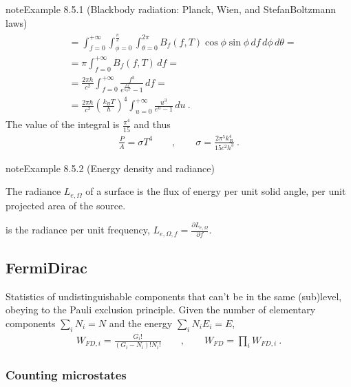 \documentclass[letterpaper,10pt,english]{jupyterBook}
\begin{document}
\begin{sphinxadmonition}{note}{Example 8.5.1 (Black\sphinxhyphen{}body radiation: Planck, Wien, and Stefan\sphinxhyphen{}Boltzmann laws)}
\begin{equation*}
\begin{split}
\begin{aligned}
  & = \int_{f=0}^{+\infty} \int_{\phi = 0}^{\frac{\pi}{2}} \int_{\theta=0}^{2\pi} B_{f}(f,T) \cos \phi \sin \phi \, df \, d\phi \, d \theta = \\
  & = \pi \int_{f=0}^{+\infty} B_{f}(f,T) \, d f = \\
  & = \frac{2 \pi h}{c^2} \int_{f=0}^{+\infty} \frac{f^3}{e^{\frac{hf}{k_B T}} - 1} \, d f = \\
  & = \frac{2 \pi h}{c^2} \left( \frac{k_B T}{h} \right)^4 \int_{u=0}^{+\infty} \frac{u^3}{e^u - 1} \, d u \ .
\end{aligned}\end{split}
\end{equation*}
\sphinxAtStartPar
The value of the integral is \(\frac{\pi^4}{15}\) and thus
\begin{equation*}
\begin{split}\frac{P}{A} = \sigma T^4 \qquad , \qquad \sigma = \frac{2 \pi^5 k_B^4}{15 c^2 h^3} \ .\end{split}
\end{equation*}\end{sphinxadmonition}
\label{ch/statistical-mechanics/notes:example-1}
\begin{sphinxadmonition}{note}{Example 8.5.2 (Energy density and radiance)}



\sphinxAtStartPar
{} The radiance \(L_{e,\Omega}\) of a surface is the flux of energy per unit solid angle, per unit projected area of the source.

\sphinxAtStartPar
{} is the radiance per unit frequency, \(L_{e, \Omega, f} = \frac{\partial L_{e,\Omega}}{\partial f}\).
\end{sphinxadmonition}


\subsection{Fermi\sphinxhyphen{}Dirac}
\label{\detokenize{ch/statistical-mechanics/notes:fermi-dirac}}\label{\detokenize{ch/statistical-mechanics/notes:statistical-mechanics-notes-distributions-fd}}
\sphinxAtStartPar
Statistics of undistinguishable components that can’t be in the same (sub)level, obeying to the Pauli exclusion principle.
Given the number of elementary components \(\sum_{i} N_i = N\) and the energy \(\sum_{i} N_i E_i = E\),
\begin{equation}\label{equation:ch/statistical-mechanics/notes:eq:fd}
\begin{split}W_{FD,i} = \frac{G_i!}{(G_i-N_i)! N_i!} \qquad , \qquad W_{FD} = \prod_i W_{FD,i} \ .\end{split}
\end{equation}\subsubsection*{Counting microstates}
\end{document}
